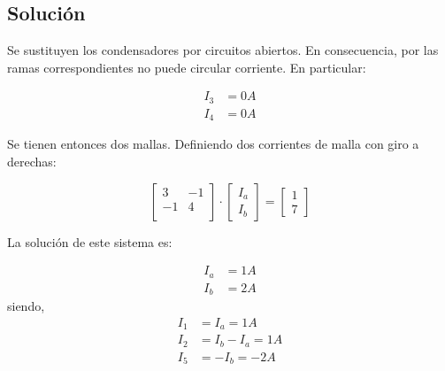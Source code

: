 \subsection*{Solución}
Se sustituyen los condensadores por circuitos abiertos. En
consecuencia, por las ramas correspondientes no puede circular
corriente. En particular:

\begin{align*}
  I_3 &= {0}{A}\\
  I_4 &= {0}{A}
\end{align*}

Se tienen entonces dos mallas. Definiendo dos corrientes de malla con
giro a derechas:

\begin{equation*}
  \begin{bmatrix}
    3 & -1\\
    -1 & 4\\
  \end{bmatrix} \cdot %
  \begin{bmatrix}
    I_a\\
    I_b
  \end{bmatrix} = %
  \begin{bmatrix}
    1\\
    7
  \end{bmatrix}
\end{equation*}

La solución de este sistema es:

\begin{align*}
  I_a &= {1}{A}\\
  I_b &= {2}{A}
\end{align*}
siendo,
\begin{align*}
  I_1 &= I_a = {1}{A}\\
  I_2 &= I_b - I_a = {1}{A}\\
  I_5 &= -I_b = {-2}{A}
\end{align*}

